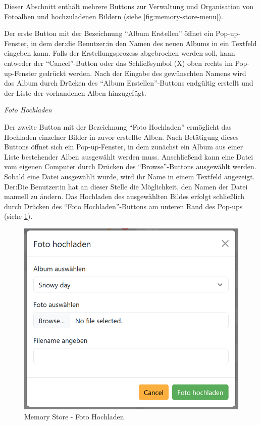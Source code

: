 Dieser Abschnitt enthält mehrere Buttons zur Verwaltung und Organisation von Fotoalben und hochzuladenen Bildern (siehe \ref{fig:memory-store-menu}).

Der erste Button mit der Bezeichnung ``Album Erstellen'' öffnet ein Pop-up-Fenster, in dem der:die Benutzer:in den Namen des neuen Albums in ein Textfeld eingeben kann. Falls der Erstellungsprozess abgebrochen werden soll, kann entweder der ``Cancel''-Button oder das Schlie\ss{}symbol (X) oben rechts im Pop-up-Fenster gedrückt werden. Nach der Eingabe des gewünschten Namens wird das Album durch Drücken des ``Album Erstellen''-Buttons endgültig erstellt und der Liste der vorhandenen Alben hinzugefügt.


{\textit{Foto Hochladen}}

Der zweite Button mit der Bezeichnung ``Foto Hochladen'' ermöglicht das Hochladen einzelner Bilder in zuvor erstellte Alben. Nach Betätigung dieses Buttons öffnet sich ein Pop-up-Fenster, in dem zunächst ein Album aus einer Liste bestehender Alben ausgewählt werden muss. Anschlie\ss{}end kann eine Datei vom eigenen Computer durch Drücken des ``Browse''-Buttons ausgewählt werden. Sobald eine Datei ausgewählt wurde, wird ihr Name in einem Textfeld angezeigt. Der:Die Benutzer:in hat an dieser Stelle die Möglichkeit, den Namen der Datei manuell zu ändern. Das Hochladen des ausgewählten Bildes erfolgt schlie\ss{}lich durch Drücken des ``Foto Hochladen''-Buttons am unteren Rand des Pop-ups (siehe \ref{fig:memory-store-foto-hochladen}).

\begin{figure}
    \centering
    \includegraphics[scale=0.4]{pics/memory_store_teil1_button2.PNG}
    \caption{Memory Store - Foto Hochladen}
    \label{fig:memory-store-foto-hochladen}
\end{figure}


